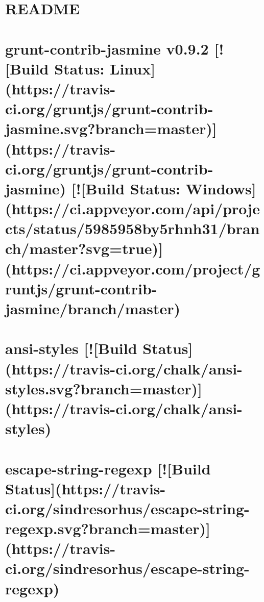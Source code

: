 \documentclass[twoside]{book}
\newcommand{\+}{\discretionary{\mbox{\scriptsize$\hookleftarrow$}}{}{}}
\begin{document}
\chapter{R\+E\+A\+D\+M\+E}
\label{md__c_1__users_martin__documents__git_hub_visual_studio__bachelor__wis_r__wis_r_node_modules_gruef47e40a705cdfe03a0fcbe4a94d11de}
\hypertarget{md__c_1__users_martin__documents__git_hub_visual_studio__bachelor__wis_r__wis_r_node_modules_gruef47e40a705cdfe03a0fcbe4a94d11de}{}

\chapter{grunt-\/contrib-\/jasmine v0.9.2 \mbox{[}!\mbox{[}Build Status\+: Linux\mbox{]}(https\+://travis-\/ci.org/gruntjs/grunt-\/contrib-\/jasmine.svg?branch=master)\mbox{]}(https\+://travis-\/ci.org/gruntjs/grunt-\/contrib-\/jasmine) \mbox{[}!\mbox{[}Build Status\+: Windows\mbox{]}(https\+://ci.appveyor.\+com/api/projects/status/5985958by5rhnh31/branch/master?svg=true)\mbox{]}(https\+://ci.appveyor.\+com/project/gruntjs/grunt-\/contrib-\/jasmine/branch/master)}
\label{md__c_1__users_martin__documents__git_hub_visual_studio__bachelor__wis_r__wis_r_node_modules_grunt-contrib-jasmine__r_e_a_d_m_e}
\hypertarget{md__c_1__users_martin__documents__git_hub_visual_studio__bachelor__wis_r__wis_r_node_modules_grunt-contrib-jasmine__r_e_a_d_m_e}{}

\chapter{ansi-\/styles \mbox{[}!\mbox{[}Build Status\mbox{]}(https\+://travis-\/ci.org/chalk/ansi-\/styles.svg?branch=master)\mbox{]}(https\+://travis-\/ci.org/chalk/ansi-\/styles)}
\label{md__c_1__users_martin__documents__git_hub_visual_studio__bachelor__wis_r__wis_r_node_modules_gru0bd1cc535571bfca945001caac3ffdc2}
\hypertarget{md__c_1__users_martin__documents__git_hub_visual_studio__bachelor__wis_r__wis_r_node_modules_gru0bd1cc535571bfca945001caac3ffdc2}{}

\chapter{escape-\/string-\/regexp \mbox{[}!\mbox{[}Build Status\mbox{]}(https\+://travis-\/ci.org/sindresorhus/escape-\/string-\/regexp.svg?branch=master)\mbox{]}(https\+://travis-\/ci.org/sindresorhus/escape-\/string-\/regexp)}
\label{md__c_1__users_martin__documents__git_hub_visual_studio__bachelor__wis_r__wis_r_node_modules_grucd65fe9fc0a13910e523bfb1021ac270}
\hypertarget{md__c_1__users_martin__documents__git_hub_visual_studio__bachelor__wis_r__wis_r_node_modules_grucd65fe9fc0a13910e523bfb1021ac270}{}

\end{document}
